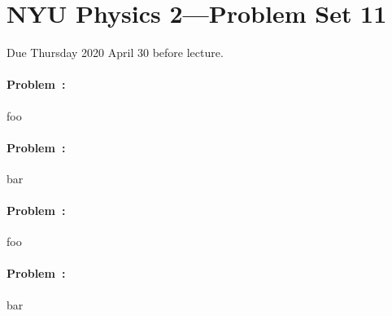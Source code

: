 \documentclass[12pt]{article}
\begin{document}
\section*{NYU Physics 2---Problem Set 11}

Due Thursday 2020 April 30 before lecture.

\paragraph{Problem~\theproblem:}%
foo

\paragraph{Problem~\theproblem:}%
bar

\paragraph{Problem~\theproblem:}%
foo

\paragraph{Problem~\theproblem:}%
bar
\end{document}
